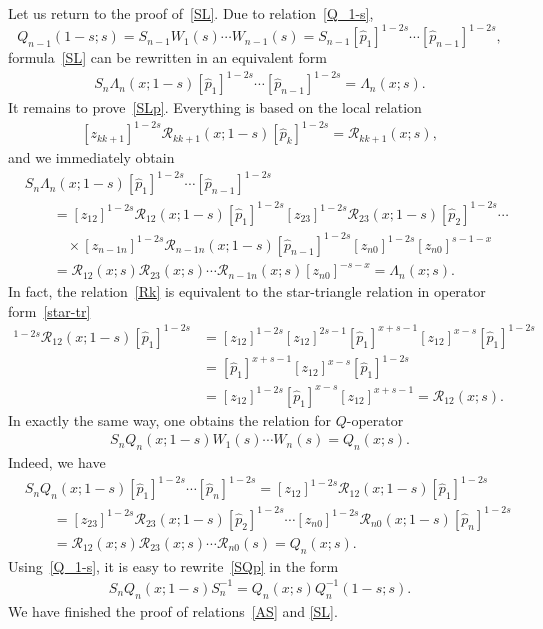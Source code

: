 \documentclass[pdftex]{sigma}
\numberwithin{equation}{section}
\begin{document}
Let us return to the proof of~\eqref{SL}.
Due to relation~\eqref{Q_1-s},
\begin{equation*}
Q_{n-1}(1-s; s) = S_{n-1} W_1(s) \cdots W_{n-1}(s) =
S_{n-1} [\hat{p}_1]^{1-2s}\cdots[\hat{p}_{n-1}]^{1-2s},
\end{equation*}
formula~\eqref{SL} can be rewritten in an equivalent form
 \begin{align}\label{SLp}
S_n \Lambda_n(x;1-s)
[\hat{p}_1]^{1-2s}\cdots[\hat{p}_{n-1}]^{1-2s} =
\Lambda_n(x;s) .
\end{align}
It remains to prove~\eqref{SLp}.
Everything is based on the local relation
\begin{align}\label{Rk}
[z_{k k+1}]^{1-2s} \mathcal{R}_{k k+1}(x;1-s) [\hat{p}_k]^{1-2s} = \mathcal{R}_{k k+1}(x;s) ,
\end{align}
and we immediately obtain
\begin{align*}
&
S_n \Lambda_n(x;1-s)
[\hat{p}_1]^{1-2s}\cdots[\hat{p}_{n-1}]^{1-2s} \\
& \qquad =
[z_{12}]^{1-2s} \mathcal{R}_{12}(x;1-s) [\hat{p}_1]^{1-2s}
[z_{23}]^{1-2s} \mathcal{R}_{23}(x;1-s) [\hat{p}_2]^{1-2s} \cdots \\
& \qquad\quad \times
[z_{n-1 n}]^{1-2s} \mathcal{R}_{n-1 n}(x;1-s)
[\hat{p}_{n-1}]^{1-2s} [z_{n0}]^{1-2s} [z_{n0}]^{s-1-x} \\
& \qquad =
\mathcal{R}_{12}(x;s) \mathcal{R}_{23}(x;s) \cdots
\mathcal{R}_{n-1 n}(x;s) [z_{n0}]^{-s-x} = \Lambda_n(x;s) .
\end{align*}
In fact, the relation~\eqref{Rk} is equivalent to the star-triangle
relation in operator form~\eqref{star-tr}
\begin{align*}
[z_{12}]^{1-2s} \mathcal{R}_{12}(x;1-s) [\hat{p}_1]^{1-2s} &=
[z_{12}]^{1-2s} [z_{12}]^{2s-1} [\hat{p}_1]^{x+s-1} [z_{12}]^{x-s}
 [\hat{p}_1]^{1-2s} \\
& =
[\hat{p}_1]^{x+s-1} [z_{12}]^{x-s}
 [\hat{p}_1]^{1-2s} \\
 &= [z_{12}]^{1-2s} [\hat{p}_1]^{x-s} [z_{12}]^{x+s-1} = \mathcal{R}_{12}(x;s) .
\end{align*}
In exactly the same way, one obtains the
relation for $Q$-operator
\begin{align}\label{SQp}
S_n Q_n(x;1-s) W_1(s) \cdots W_{n}(s) =
Q_n(x;s).
\end{align}
Indeed, we have
\begin{align*}
&S_n Q_n(x;1-s)
[\hat{p}_1]^{1-2s}\cdots[\hat{p}_{n}]^{1-2s}=
[z_{12}]^{1-2s} \mathcal{R}_{12}(x;1-s) [\hat{p}_1]^{1-2s} \\
& \qquad =
[z_{23}]^{1-2s} \mathcal{R}_{23}(x;1-s) [\hat{p}_2]^{1-2s} \cdots
[z_{n 0}]^{1-2s} \mathcal{R}_{n 0}(x;1-s)
[\hat{p}_{n}]^{1-2s} \\
& \qquad =
\mathcal{R}_{12}(x;s) \mathcal{R}_{23}(x;s) \cdots
\mathcal{R}_{n 0}(s) = Q_n(x;s) .
\end{align*}
Using~\eqref{Q_1-s}, it is easy to rewrite~\eqref{SQp} in the form
\begin{align*}
S_n Q_n(x;1-s) S^{-1}_{n} =
Q_n(x;s) Q^{-1}_{n}(1-s;s) .
\end{align*}
We have finished the proof
of relations~\eqref{AS} and \eqref{SL}.
\end{document}
